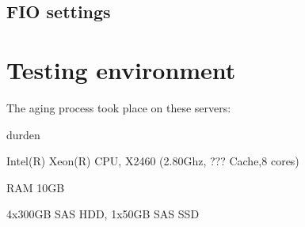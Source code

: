\documentclass[
  color, %
  table, %
  lof,   %
  lot,   %
]{fithesis3}
\begin{document}
\section{FIO settings}







\chapter{Testing environment}
The aging process took place on these servers:
\begin{compactenum}
  \item durden
  \item Intel(R) Xeon(R) CPU, X2460 (2.80Ghz, ??? Cache,8 cores)
  \item RAM 10GB
  \item 4x300GB SAS HDD, 1x50GB SAS SSD
\end{compactenum}
\end{document}
